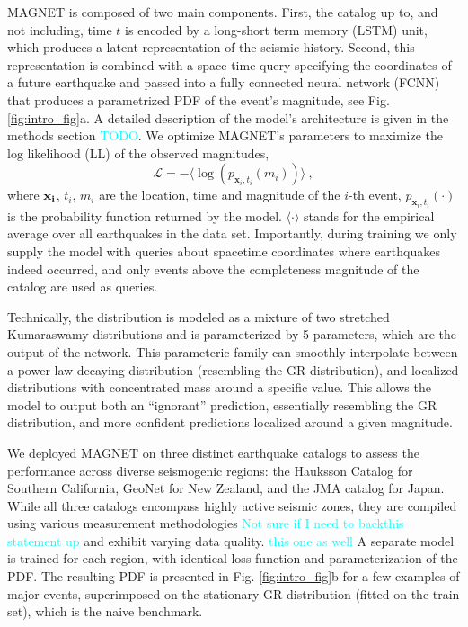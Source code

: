 \documentclass[pdflatex]{sn-jnl}
\newcommand{\neri}[1]{{\textcolor{cyan}{#1}}}
\begin{document}
MAGNET is composed of two main components. First, the catalog up to, and not including, time $t$ is encoded by a long-short term memory (LSTM) unit, which produces a latent representation of the seismic history.
Second, this representation is combined with a space-time query specifying the coordinates of a future earthquake and passed into a fully connected neural network (FCNN) that produces a parametrized PDF of the event's magnitude, see Fig. \ref{fig:intro_fig}a. A detailed description of the model's architecture is given in the methods section \neri{TODO}. We optimize MAGNET's parameters to maximize the log likelihood (LL) of the observed magnitudes,
\begin{equation}
    \mathcal{L} = -\langle \log{ \left( p_{\textbf{x}_i, t_i} \left( m_i \right) \right) } \rangle\ ,
    \label{eq:loss_function}
\end{equation}
where $\bf{x}_i$, $t_i$, $m_i$ are the location, time and magnitude of the $i$-th event, $p_{\textbf{x}_i, t_i}(\cdot)$ is the probability function returned by the model. $\langle \cdot\rangle$ stands for the empirical average over all earthquakes in the data set. Importantly, during training we only supply the model with queries about spacetime coordinates where earthquakes indeed occurred, and only events above the completeness magnitude of the catalog are used as queries.

Technically, the distribution is modeled as a mixture of two stretched Kumaraswamy distributions \cite{kumaraswamy_generalized_1980} and is parameterized by 5 parameters, which are the output of the network. This parameteric family can  smoothly interpolate between a power-law decaying distribution (resembling the GR distribution), and localized distributions with concentrated mass around a specific value. This allows the model to output both an ``ignorant'' prediction, essentially resembling the GR distribution, and more confident predictions localized around a given magnitude.

We deployed MAGNET on three distinct earthquake catalogs to assess the performance across diverse seismogenic regions: the Hauksson Catalog \cite{hauksson_waveform_2012} for Southern California, GeoNet \cite{gns_geonet_1970} for New Zealand, and the JMA catalog \cite{noauthor_japan_nodate-1} for Japan. While all three catalogs encompass highly active seismic zones, they are compiled using various measurement methodologies \neri{Not sure if I need to backthis statement up} and exhibit varying data quality. \neri{this one as well} A separate model is trained for each region, with identical loss function and parameterization of the PDF. The resulting PDF is presented in Fig. \ref{fig:intro_fig}b for a few examples of major events, superimposed on the stationary GR distribution (fitted on the train set), which is the naive benchmark.
\end{document}
